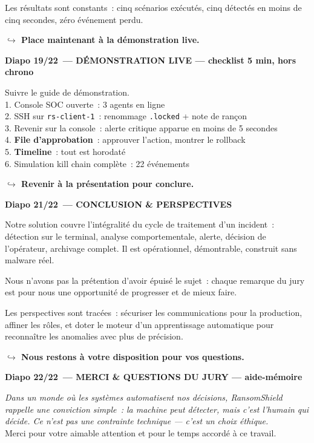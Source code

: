 \documentclass[a4paper,11pt]{article}
\newcommand{\notehead}[2]{%
  \par\vspace{14pt}%
  {\color{white}\colorbox{primary}{\parbox{\dimexpr\linewidth-12pt}{\vspace{3pt}%
    \bfseries\large Diapo #1~--- #2\vspace{3pt}}}}%
  \par\vspace{6pt}%
}
\newcommand{\pivot}[1]{%
  \par\vspace{3pt}%
  {\color{transition}\small\bfseries $\hookrightarrow$ #1}%
}
\begin{document}
Les résultats sont constants~: cinq scénarios exécutés, cinq détectés en moins de cinq secondes,
  zéro événement perdu.
\pivot{Place maintenant à la démonstration live.}

\notehead{19/22}{DÉMONSTRATION LIVE --- checklist 5 min, hors chrono}
Suivre le guide de démonstration.\\[6pt]
  1. Console SOC ouverte~: 3 agents en ligne\\[3pt]
  2. SSH sur \texttt{rs-client-1}~: renommage \texttt{.locked} + note de rançon\\[3pt]
  3. Revenir sur la console~: alerte critique apparue en moins de 5 secondes\\[3pt]
  4. \textbf{File d'approbation}~: approuver l'action, montrer le rollback\\[3pt]
  5. \textbf{Timeline}~: tout est horodaté\\[3pt]
  6. Simulation kill chain complète~: 22 événements
\pivot{Revenir à la présentation pour conclure.}

\newpage
\notehead{21/22}{CONCLUSION \& PERSPECTIVES}
Notre solution couvre l'intégralité du cycle de traitement d'un incident~: détection sur le terminal,
  analyse comportementale, alerte, décision de l'opérateur, archivage complet. Il est opérationnel,
  démontrable, construit sans malware réel.

Nous n'avons pas la prétention d'avoir épuisé le sujet~: chaque remarque du jury est pour nous
  une opportunité de progresser et de mieux faire.

Les perspectives sont tracées~: sécuriser les communications pour la production, affiner les rôles,
  et doter le moteur d'un apprentissage automatique pour reconnaître les anomalies avec plus de précision.
\pivot{Nous restons à votre disposition pour vos questions.}

\vspace{14pt}
\notehead{22/22}{MERCI \& QUESTIONS DU JURY --- aide-mémoire}
{\itshape Dans un monde où les systèmes automatisent nos décisions, RansomShield rappelle une
  conviction simple~: la machine peut détecter, mais c'est l'humain qui décide. Ce n'est pas une
  contrainte technique --- c'est un choix éthique.}\\[6pt]
  Merci pour votre aimable attention et pour le temps accordé à ce travail.
\end{document}
